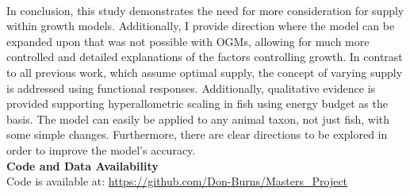 \documentclass[a4paper, 11pt, hidelinks]{article} %
\begin{document}
%	
%	
%	
%	
	\\
	In conclusion, this study demonstrates the need for more consideration for supply within growth models.  Additionally, I provide direction where the model can be expanded upon that was not possible with OGMs, allowing for much more controlled and detailed explanations of the factors controlling growth.  In contrast to all previous work, which assume optimal supply, the concept of varying supply is addressed using functional responses.  Additionally, qualitative evidence is provided supporting hyperallometric scaling in fish using energy budget as the basis.  The model can easily be applied to any animal taxon, not just fish, with some simple changes.  Furthermore, there are clear directions to be explored in order to improve the model's accuracy.
	\\
	\textbf{Code and Data Availability}
	\\
	Code is available at: \url{https://github.com/Don-Burns/Masters_Project}
	
	\nolinenumbers
	
	
	\newpage
	\linenumbers
	
	
	\printbibliography
	
	\nolinenumbers
	
	
	\newpage
	
	
	
\end{document}
